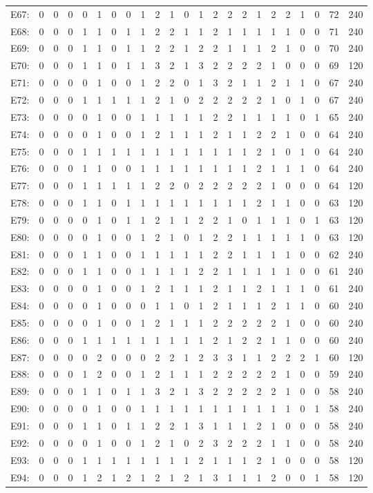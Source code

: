 \documentclass[12pt]{article}
\begin{document}
\begin{center}
\begin{tabular}{ccccccccccccccccccccc|c|c}
E67:&0&0&0&0&1&0&0&1&2&1&0&1&2&2&2&1&2&2&1&0&72&240\\
E68:&0&0&0&1&1&0&1&1&2&2&1&1&2&1&1&1&1&1&0&0&71&240\\
E69:&0&0&0&1&1&0&1&1&2&2&1&2&2&1&1&1&2&1&0&0&70&240\\
E70:&0&0&0&1&1&0&1&1&3&2&1&3&2&2&2&2&1&0&0&0&69&120\\
E71:&0&0&0&0&1&0&0&1&2&2&0&1&3&2&1&1&2&1&1&0&67&240\\
E72:&0&0&0&1&1&1&1&1&2&1&0&2&2&2&2&2&1&0&1&0&67&240\\
E73:&0&0&0&0&1&0&0&1&1&1&1&1&2&2&1&1&1&1&0&1&65&240\\
E74:&0&0&0&0&1&0&0&1&2&1&1&1&2&1&1&2&2&1&0&0&64&240\\
E75:&0&0&0&1&1&1&1&1&1&1&1&1&1&1&1&2&1&0&1&0&64&240\\
E76:&0&0&0&1&1&0&0&1&1&1&1&1&1&1&1&2&1&1&1&0&64&240\\
E77:&0&0&0&1&1&1&1&1&2&2&0&2&2&2&2&2&1&0&0&0&64&120\\
E78:&0&0&0&1&1&0&1&1&1&1&1&1&1&1&1&2&1&1&0&0&63&120\\
E79:&0&0&0&0&1&0&1&1&2&1&1&2&2&1&0&1&1&1&0&1&63&120\\
E80:&0&0&0&0&1&0&0&1&2&1&0&1&2&2&1&1&1&1&1&0&63&120\\
E81:&0&0&0&1&1&0&0&1&1&1&1&1&2&2&1&1&1&1&0&0&62&240\\
E82:&0&0&0&1&1&0&0&1&1&1&1&2&2&1&1&1&1&1&0&0&61&240\\
E83:&0&0&0&0&1&0&0&1&2&1&1&1&2&1&1&2&1&1&1&0&61&240\\
E84:&0&0&0&0&1&0&0&0&1&1&0&1&2&1&1&1&2&1&1&0&60&240\\
E85:&0&0&0&0&1&0&0&1&2&1&1&1&2&2&2&2&2&1&0&0&60&240\\
E86:&0&0&0&1&1&1&1&1&1&1&1&1&2&1&2&2&1&1&0&0&60&240\\
E87:&0&0&0&0&2&0&0&0&2&2&1&2&3&3&1&1&2&2&2&1&60&120\\
E88:&0&0&0&1&2&0&0&1&2&1&1&1&2&2&2&2&2&1&0&0&59&240\\
E89:&0&0&0&1&1&0&1&1&3&2&1&3&2&2&2&2&2&1&0&0&58&240\\
E90:&0&0&0&0&1&0&0&1&1&1&1&1&1&1&1&1&1&1&0&1&58&240\\
E91:&0&0&0&1&1&0&1&1&2&2&1&3&1&1&1&2&1&0&0&0&58&240\\
E92:&0&0&0&0&1&0&0&1&2&1&0&2&3&2&2&2&1&1&0&0&58&240\\
E93:&0&0&0&1&1&1&1&1&1&1&1&2&1&1&1&2&1&0&0&0&58&120\\
E94:&0&0&0&1&2&1&2&1&2&1&2&1&3&1&1&1&2&0&0&1&58&120\\

\end{tabular}
\end{center}
\end{document}
